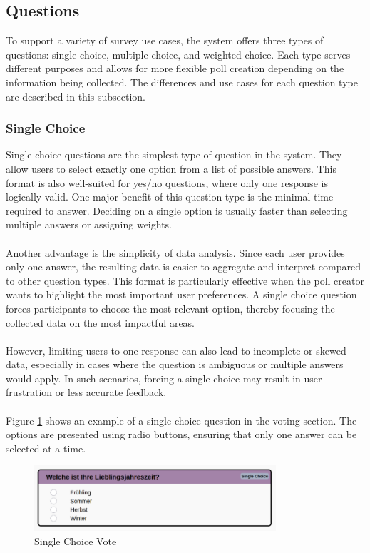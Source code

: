 \documentclass[a4paper,12pt]{report}
\begin{document}
\subsection{Questions}
To support a variety of survey use cases, the system offers three types of questions: single choice, multiple choice, and weighted choice. Each type serves different purposes and allows for more flexible poll creation depending on the information being collected. The differences and use cases for each question type are described in this subsection.
\subsubsection{Single Choice}
Single choice questions are the simplest type of question in the system. They allow users to select exactly one option from a list of possible answers. This format is also well-suited for yes/no questions, where only one response is logically valid. One major benefit of this question type is the minimal time required to answer. Deciding on a single option is usually faster than selecting multiple answers or assigning weights. \\ \\
Another advantage is the simplicity of data analysis. Since each user provides only one answer, the resulting data is easier to aggregate and interpret compared to other question types. This format is particularly effective when the poll creator wants to highlight the most important user preferences. A single choice question forces participants to choose the most relevant option, thereby focusing the collected data on the most impactful areas. \\ \\
However, limiting users to one response can also lead to incomplete or skewed data, especially in cases where the question is ambiguous or multiple answers would apply. In such scenarios, forcing a single choice may result in user frustration or less accurate feedback. \cite{singlevsmultiple} \\ \\
Figure \ref{fig:singlechoice} shows an example of a single choice question in the voting section. The options are presented using radio buttons, ensuring that only one answer can be selected at a time.
\begin{figure}[H]	
	\centering	
	\includegraphics[width=0.8\textwidth]{pics/Single_Choice.png}	
	\caption{Single Choice Vote}	
	\label{fig:singlechoice}
\end{figure}
\end{document}
